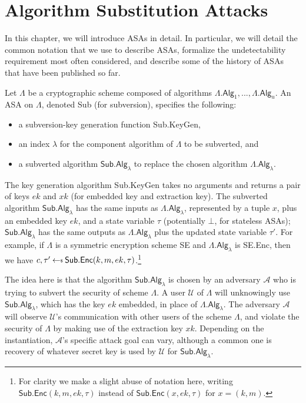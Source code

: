 \chapter{Algorithm Substitution Attacks} \label{sec:ASA}

In this chapter, we will introduce ASAs in detail. In particular, we will detail the common notation that we use to describe ASAs, formalize the undetectability requirement most often considered, and describe some of the history of ASAs that have been published so far.

Let $\mathsf{\Lambda}$ be a cryptographic scheme composed of algorithms $\mathsf{\Lambda.Alg}_1,..., \mathsf{\Lambda.Alg}_u$. An ASA on $\mathsf{\Lambda}$, denoted \textsf{Sub} (for subversion), specifies the following:
\begin{itemize}
\item a subversion-key generation function \textsf{Sub.KeyGen},
\item an index $\lambda$ for the component algorithm of $\mathsf{\Lambda}$ to be subverted, and
\item a subverted algorithm $\mathsf{Sub.Alg}_\lambda$ to replace the chosen algorithm $\mathsf{\Lambda.Alg}_\lambda$.
\end{itemize}

The key generation algorithm \textsf{Sub.KeyGen} takes no arguments and returns a pair of keys $ek$ and $xk$ (for embedded key and extraction key). The subverted algorithm $\mathsf{Sub.Alg}_\lambda$ has the same inputs as $\mathsf{\Lambda.Alg}_\lambda$, represented by a tuple $x$, plus an embedded key $ek$, and a state variable $\tau$ (potentially $\bot$, for stateless ASAs); $\mathsf{Sub.Alg}_\lambda$ has the same outputs as $\mathsf{\Lambda.Alg}_\lambda$ plus the updated state variable $\tau'$. For example, if $\mathsf{\Lambda}$ is a symmetric encryption scheme \textsf{SE} and $\mathsf{\Lambda.Alg}_\lambda$ is \textsf{SE.Enc}, then we have $c, \tau' \sample \mathsf{Sub.Enc}(k, m, ek, \tau)$.\footnote{For clarity we make a slight abuse of notation here, writing $\mathsf{Sub.Enc}(k, m, ek, \tau)$ instead of $\mathsf{Sub.Enc}(x, ek, \tau)$ for $x=(k, m)$.}

The idea here is that the algorithm $\mathsf{Sub.Alg}_\lambda$ is chosen by an adversary $\mathcal{A}$ who is trying to subvert the security of scheme $\mathsf{\Lambda}$. A user $\mathcal{U}$ of $\mathsf{\Lambda}$ will unknowingly use $\mathsf{Sub.Alg}_\lambda$, which has the key $ek$ embedded, in place of $\mathsf{\Lambda.Alg}_\lambda$. The adversary $\mathcal{A}$ will observe $\mathcal{U}$'s communication with other users of the scheme $\mathsf{\Lambda}$, and violate the security of $\mathsf{\Lambda}$ by making use of the extraction key $xk$. Depending on the instantiation, $\mathcal{A}$'s specific attack goal can vary, although a common one is recovery of whatever secret key is used by $\mathcal{U}$ for $\mathsf{Sub.Alg}_\lambda$.

